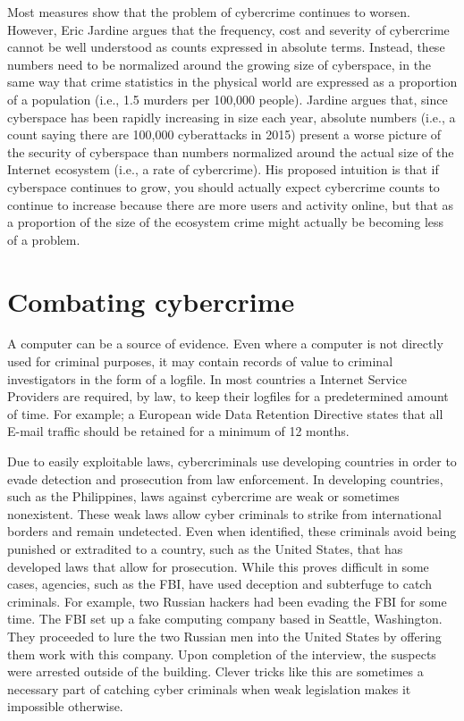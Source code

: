 \documentclass[12pt]{article}
\begin{document}
Most measures show that the problem of cybercrime continues to worsen. However, Eric Jardine argues that the frequency, cost and severity of cybercrime cannot be well understood as counts expressed in absolute terms. Instead, these numbers need to be normalized around the growing size of cyberspace, in the same way that crime statistics in the physical world are expressed as a proportion of a population (i.e., 1.5 murders per 100,000 people). Jardine argues that, since cyberspace has been rapidly increasing in size each year, absolute numbers (i.e., a count saying there are 100,000 cyberattacks in 2015) present a worse picture of the security of cyberspace than numbers normalized around the actual size of the Internet ecosystem (i.e., a rate of cybercrime). His proposed intuition is that if cyberspace continues to grow, you should actually expect cybercrime counts to continue to increase because there are more users and activity online, but that as a proportion of the size of the ecosystem crime might actually be becoming less of a problem.

\section{Combating cybercrime} 

A computer can be a source of evidence. Even where a computer is not directly used for criminal purposes, it may contain records of value to criminal investigators in the form of a logfile. In most countries a Internet Service Providers are required, by law, to keep their logfiles for a predetermined amount of time. For example; a European wide Data Retention Directive states that all E-mail traffic should be retained for a minimum of 12 months.

Due to easily exploitable laws, cybercriminals use developing countries in order to evade detection and prosecution from law enforcement. In developing countries, such as the Philippines, laws against cybercrime are weak or sometimes nonexistent. These weak laws allow cyber criminals to strike from international borders and remain undetected. Even when identified, these criminals avoid being punished or extradited to a country, such as the United States, that has developed laws that allow for prosecution. While this proves difficult in some cases, agencies, such as the FBI, have used deception and subterfuge to catch criminals. For example, two Russian hackers had been evading the FBI for some time. The FBI set up a fake computing company based in Seattle, Washington. They proceeded to lure the two Russian men into the United States by offering them work with this company. Upon completion of the interview, the suspects were arrested outside of the building. Clever tricks like this are sometimes a necessary part of catching cyber criminals when weak legislation makes it impossible otherwise.
\end{document}
